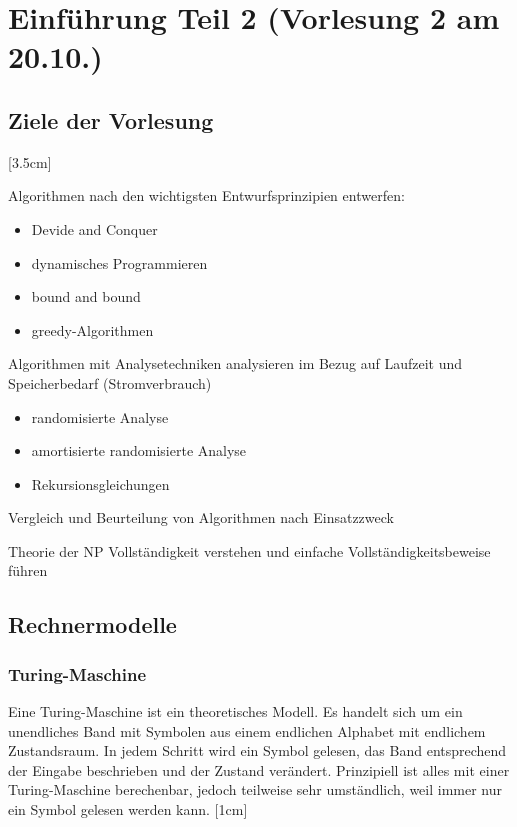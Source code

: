 \section{Einführung Teil 2 \tiny (Vorlesung 2 am 20.10.)}
\subsection{Ziele der Vorlesung}
[3.5cm]
\begin{compactitem}
\item Algorithmen nach den wichtigsten Entwurfsprinzipien entwerfen:
	\begin{itemize}
	\item Devide and Conquer
	\item dynamisches Programmieren
	\item bound and bound
	\item greedy-Algorithmen
	\end{itemize}
\item Algorithmen mit Analysetechniken analysieren im Bezug auf Laufzeit und Speicherbedarf (Stromverbrauch)
	\begin{itemize}
	\item randomisierte Analyse
	\item amortisierte randomisierte Analyse
	\item Rekursionsgleichungen
	\end{itemize}
\item Vergleich und Beurteilung von Algorithmen nach Einsatzzweck
\item Theorie der NP Vollständigkeit verstehen und einfache Vollständigkeitsbeweise führen
\end{compactitem}
\subsection{Rechnermodelle}
\subsubsection{Turing-Maschine}
Eine Turing-Maschine ist ein theoretisches Modell. Es handelt sich um ein unendliches Band mit Symbolen aus einem endlichen Alphabet mit endlichem Zustandsraum. In jedem Schritt wird ein Symbol gelesen, das Band entsprechend der Eingabe beschrieben und der Zustand verändert. Prinzipiell ist alles mit einer Turing-Maschine berechenbar, jedoch teilweise sehr umständlich, weil immer nur ein Symbol gelesen werden kann.
[1cm]
